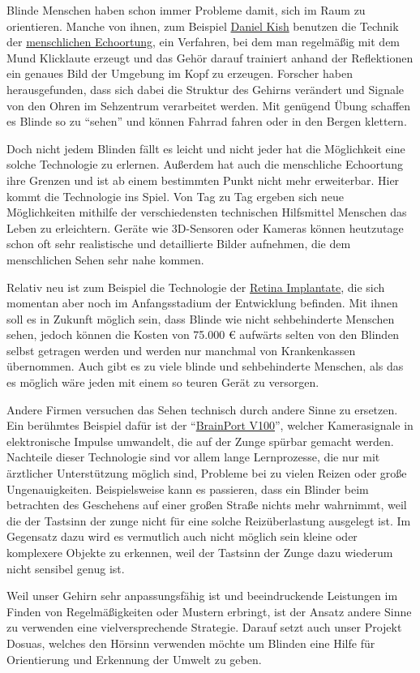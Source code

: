 \documentclass[a4paper,12pt,ngerman]{scrartcl}
\begin{document}
Blinde Menschen haben schon immer Probleme damit, sich im Raum zu orientieren.
Manche von ihnen, zum Beispiel \href{https://en.wikipedia.org/wiki/Daniel_Kish}
{Daniel Kish} benutzen die Technik der \href{https://de.wikipedia.org/wiki/Menschliche_Echoortung}{menschlichen Echoortung}, ein Verfahren, bei dem
man regelmäßig mit dem Mund Klicklaute erzeugt und das Gehör darauf trainiert 
anhand der Reflektionen ein genaues Bild der Umgebung im Kopf zu erzeugen.
Forscher haben herausgefunden, dass sich dabei die Struktur des Gehirns verändert 
und Signale von den Ohren im Sehzentrum verarbeitet werden.
Mit genügend Übung schaffen es Blinde so zu \enquote{sehen} und können Fahrrad 
fahren oder in den Bergen klettern. \par 
Doch nicht jedem Blinden fällt es leicht und nicht jeder hat die Möglichkeit eine
solche Technologie zu erlernen. Außerdem hat auch die menschliche Echoortung ihre
Grenzen und ist ab einem bestimmten Punkt nicht mehr erweiterbar. Hier kommt die 
Technologie ins Spiel. Von Tag zu Tag ergeben sich neue Möglichkeiten mithilfe 
der verschiedensten technischen Hilfsmittel Menschen das Leben zu erleichtern.
Geräte wie 3D-Sensoren oder Kameras können heutzutage schon oft sehr realistische
und detaillierte Bilder aufnehmen, die dem menschlichen Sehen sehr nahe kommen. \par 
Relativ neu ist zum Beispiel die Technologie der 
\href{https://de.wikipedia.org/wiki/Retina-Implantat}{Retina Implantate}, die sich 
momentan aber noch im Anfangsstadium der Entwicklung befinden. Mit ihnen soll es in 
Zukunft möglich sein, dass Blinde wie nicht sehbehinderte Menschen sehen, jedoch
können die Kosten von 75.000 \euro{} aufwärts selten von den Blinden selbst getragen
werden und werden nur manchmal von Krankenkassen übernommen. Auch gibt es zu viele
blinde und sehbehinderte Menschen, als das es möglich wäre jeden mit einem so 
teuren Gerät zu versorgen.\par 
Andere Firmen versuchen das Sehen technisch durch andere Sinne zu ersetzen.
Ein berühmtes Beispiel dafür ist der 
\enquote{\href{https://www.wicab.com/brainport-v100}{BrainPort V100}}, welcher 
Kamerasignale in elektronische Impulse umwandelt, die auf der Zunge spürbar
gemacht werden. Nachteile dieser
Technologie sind vor allem lange Lernprozesse, die nur mit ärztlicher Unterstützung
möglich sind, Probleme bei zu vielen Reizen oder große Ungenauigkeiten.
Beispielsweise kann es passieren, dass ein Blinder beim betrachten des Geschehens auf 
einer großen Straße nichts mehr wahrnimmt, weil die der Tastsinn der zunge
nicht für eine 
solche Reizüberlastung ausgelegt ist. Im Gegensatz dazu wird es vermutlich auch nicht
möglich sein kleine oder komplexere Objekte zu erkennen, weil der Tastsinn der Zunge
dazu wiederum nicht sensibel genug ist. \par
Weil unser Gehirn sehr anpassungsfähig ist und beeindruckende
Leistungen im Finden von Regelmäßigkeiten oder Mustern erbringt, ist der Ansatz
andere Sinne zu verwenden eine vielversprechende Strategie. Darauf setzt auch 
unser Projekt Dosuas, welches den Hörsinn verwenden möchte um Blinden eine Hilfe
für Orientierung und Erkennung der Umwelt zu geben.
 
\end{document}
